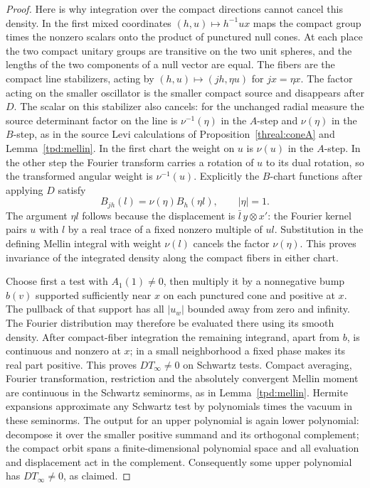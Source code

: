 \begin{proof}
Here is why integration over the compact directions cannot cancel
this density. In the first mixed coordinates
\((h,u)\mapsto h^{-1}ux\) maps the compact group times the
nonzero scalars onto the product of punctured null cones. At each
place the two compact unitary groups are transitive on the two
unit spheres, and the lengths of the two components of a null
vector are equal. The fibers are the compact line stabilizers,
acting by \((h,u)\mapsto(jh,\eta u)\) for \(jx=\eta x\).
The factor acting on the smaller oscillator is the smaller compact
source and disappears after \(D\). The scalar on this stabilizer
also cancels: for the unchanged radial measure the source determinant
factor on the line is \(\nu^{-1}(\eta)\) in the \(A\)-step and
\(\nu(\eta)\) in the \(B\)-step, as in the source Levi calculations
of Proposition~\ref{threal:coneA} and Lemma~\ref{tpd:mellin}.
In the first chart the weight on \(u\) is \(\nu(u)\) in the
\(A\)-step. In the other step the Fourier transform carries a
rotation of \(u\) to its dual rotation, so the transformed angular
weight is \(\nu^{-1}(u)\). Explicitly the \(B\)-chart functions
after applying \(D\) satisfy
\[
        B_{jh}(l)=\nu(\eta)B_h(\eta l),\qquad |\eta|=1.
\]
The argument \(\eta l\) follows because the displacement is
\(\bar l\,y\otimes x'\): the Fourier kernel pairs \(u\) with \(l\)
by a real trace of a fixed nonzero multiple of \(ul\).
Substitution in the defining Mellin integral with weight \(\nu(l)\)
cancels the factor \(\nu(\eta)\). This proves invariance of the integrated density
along the compact fibers in either chart.

Choose first a test with \(A_1(1)\ne0\), then multiply it by a
nonnegative bump \(b(v)\) supported sufficiently near \(x\) on
each punctured cone and positive at \(x\). The pullback of that
support has all \(|u_w|\) bounded away from zero and infinity.
The Fourier distribution may therefore be evaluated there using
its smooth density. After compact-fiber integration the remaining
integrand, apart from \(b\), is continuous and nonzero at \(x\);
in a small neighborhood a fixed phase makes its real part positive.
This proves \(DT_\infty\ne0\) on Schwartz tests. Compact averaging,
Fourier transformation, restriction and the absolutely convergent
Mellin moment are continuous in the Schwartz seminorms, as in
Lemma~\ref{tpd:mellin}. Hermite expansions approximate any
Schwartz test by polynomials times the vacuum in these seminorms.
The output for an upper polynomial is again lower polynomial:
decompose it over the smaller positive summand and its orthogonal
complement; the compact orbit spans a finite-dimensional polynomial
space and all evaluation and displacement act in the complement.
Consequently some upper polynomial has \(DT_\infty\ne0\), as claimed.
\end{proof}

